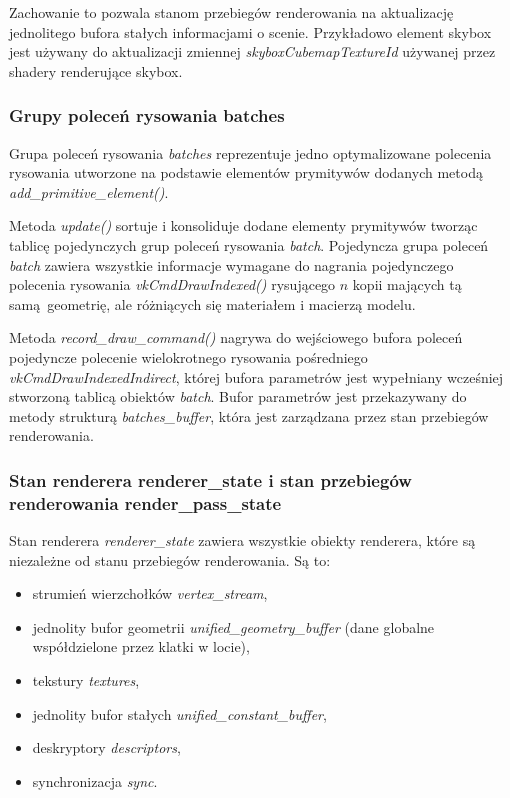 Zachowanie to pozwala stanom przebiegów renderowania na aktualizację jednolitego bufora stałych informacjami o scenie.
Przykładowo element skybox jest używany do aktualizacji zmiennej \textit{skyboxCubemapTextureId} używanej przez shadery renderujące skybox.


\subsubsection{Grupy poleceń rysowania batches}
Grupa poleceń rysowania \textit{batches} reprezentuje jedno optymalizowane polecenia rysowania utworzone na podstawie elementów prymitywów dodanych metodą \textit{add\_primitive\_element()}.

Metoda \textit{update()} sortuje i konsoliduje dodane elementy prymitywów tworząc tablicę pojedynczych grup poleceń rysowania \textit{batch}.
Pojedyncza grupa poleceń \textit{batch} zawiera wszystkie informacje wymagane do nagrania pojedynczego polecenia rysowania \textit{vkCmdDrawIndexed()} rysującego $n$ kopii mających tą samą geometrię, ale różniących się materiałem i macierzą modelu.

Metoda \textit{record\_draw\_command()} nagrywa do wejściowego bufora poleceń pojedyncze polecenie wielokrotnego rysowania pośredniego \textit{vkCmdDrawIndexedIndirect}, której bufora parametrów jest wypełniany wcześniej stworzoną tablicą obiektów \textit{batch}.
Bufor parametrów jest przekazywany do metody strukturą \textit{batches\_buffer}, która jest zarządzana przez stan przebiegów renderowania.


\subsubsection{Stan renderera renderer\_state i stan przebiegów renderowania render\_pass\_state}
Stan renderera \textit{renderer\_state} zawiera wszystkie obiekty renderera, które są niezależne od stanu przebiegów renderowania.
Są to:
\begin{itemize}
	\item strumień wierzchołków \textit{vertex\_stream},
	\item jednolity bufor geometrii \textit{unified\_geometry\_buffer} (dane globalne współdzielone przez klatki w locie),
	\item tekstury \textit{textures},
	\item jednolity bufor stałych \textit{unified\_constant\_buffer},
	\item deskryptory \textit{descriptors},
	\item synchronizacja \textit{sync}.
\end{itemize}

